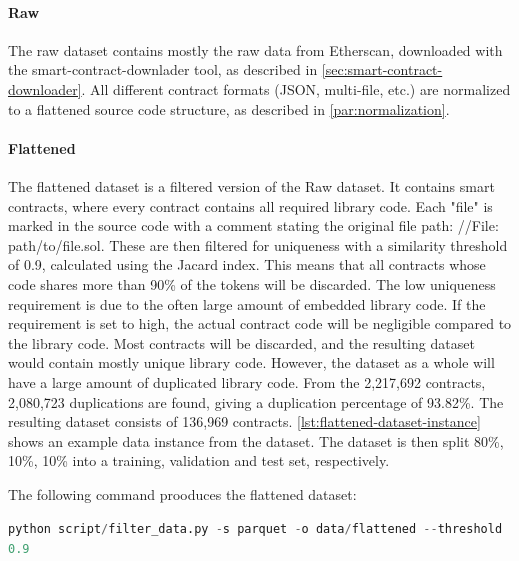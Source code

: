 \paragraph{Raw}
\label{sec:verified-smart-contracts-raw}
The raw dataset contains mostly the raw data from Etherscan, downloaded with the smart-contract-downlader tool, as described in \cref{sec:smart-contract-downloader}. All different contract formats (JSON, multi-file, etc.) are normalized to a flattened source code structure, as described in \cref{par:normalization}. 


\paragraph{Flattened}
\label{sec:verified-smart-contracts-flattened}

The flattened dataset is a filtered version of the Raw dataset. It contains smart contracts, where every contract contains all required library code. Each "file" is marked in the source code with a comment stating the original file path: //File: path/to/file.sol. These are then filtered for uniqueness with a similarity threshold of 0.9,  calculated using the Jacard index. This means that all contracts whose code shares more than 90\% of the tokens will be discarded. The low uniqueness requirement is due to the often large amount of embedded library code. If the requirement is set to high, the actual contract code will be negligible compared to the library code. Most contracts will be discarded, and the resulting dataset would contain mostly unique library code. However, the dataset as a whole will have a large amount of duplicated library code. From the 2,217,692 contracts, 2,080,723 duplications are found, giving a duplication percentage of 93.82\%. The resulting dataset consists of 136,969 contracts. \cref{lst:flattened-dataset-instance} shows an example data instance from the dataset. The dataset is then split 80\%, 10\%, 10\% into a training, validation and test set, respectively.


The following command prooduces the flattened dataset:

\lstinline[language=Python]!python script/filter_data.py -s parquet -o data/flattened --threshold 0.9!


